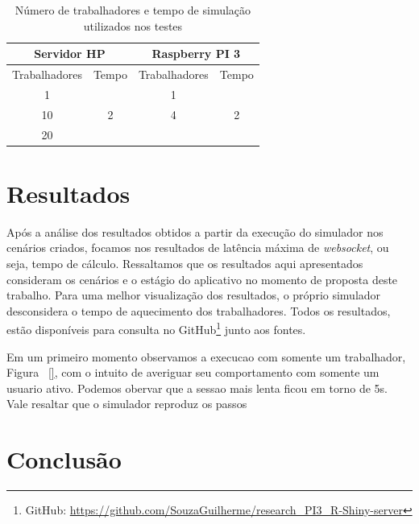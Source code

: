 \documentclass[12pt,english,brazil]{article}
\begin{document}
\begin{table}[htbp]
\centering
\caption{Número de trabalhadores e tempo de simulação utilizados nos testes}
\begin{tabular}{c|c|cc}
\hline
\multicolumn{2}{c|}{\textbf{Servidor HP}} & \multicolumn{2}{c}{\textbf{Raspberry PI 3}}             \\ \hline
Trabalhadores     & Tempo                 & \multicolumn{1}{c|}{Trabalhadores} & Tempo              \\ \hline
1                 & \multirow{3}{*}{2}    & \multicolumn{1}{c|}{1}             & \multirow{3}{*}{2} \\ \cline{1-1} \cline{3-3}
10                &                       & \multicolumn{1}{c|}{4}            &                    \\ \cline{1-1} \cline{3-3}
20                &                       & \multicolumn{1}{c|}{}            &                    \\ \hline
\end{tabular}
\label{tab:workers}
\end{table}

\section{Resultados} \label{sec:Resultados}
Após a análise dos resultados obtidos a partir da execução do simulador nos cenários criados, focamos nos resultados de latência máxima de \emph{websocket}, ou seja, tempo de cálculo. Ressaltamos que os resultados aqui apresentados consideram os cenários e o estágio do aplicativo no momento de proposta deste trabalho. Para uma melhor visualização dos resultados, o próprio simulador desconsidera o tempo de aquecimento dos trabalhadores. Todos os resultados, estão disponíveis para consulta no GitHub\footnote{GitHub: \url{https://github.com/SouzaGuilherme/research_PI3_R-Shiny-server}} junto aos fontes.

Em um primeiro momento observamos a execucao com somente um trabalhador, Figura ~\ref{}, com o intuito de averiguar seu comportamento com somente um usuario ativo. Podemos obervar que a sessao mais lenta ficou em torno de 5s. Vale resaltar que o simulador reproduz os passos 

\section{Conclusão} \label{sec:conlusao}





\end{document}
